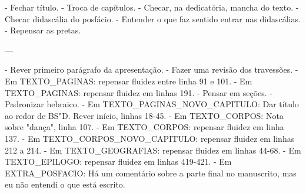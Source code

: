 - Fechar título.
- Troca de capítulos.
- Checar, na dedicatória, mancha do texto.
- Checar didascália do posfácio.
- Entender o que faz sentido entrar nas didascálias.
- Repensar as pretas.

---

- Rever primeiro parágrafo da apresentação.
- Fazer uma revisão dos travessões.
- Em TEXTO_PAGINAS: repensar fluidez entre linha 91 e 101.
- Em TEXTO_PAGINAS: repensar fluidez em linhas 191.
- Pensar em seções.
- Padronizar hebraico.
- Em TEXTO_PAGINAS_NOVO_CAPITULO: Dar título ao redor de BS"D. Rever início, linhas 18-45.
- Em TEXTO_CORPOS: Nota sobre "dança", linha 107.
- Em TEXTO_CORPOS: repensar fluidez em linha 137.
- Em TEXTO_CORPOS_NOVO_CAPITULO: repensar fluidez em linhas 212 a 214.
- Em TEXTO_GEOGRAFIAS: repensar fluidez em linhas 44-68.
- Em TEXTO_EPILOGO: repensar fluidez em linhas 419-421.
- Em EXTRA_POSFACIO: Há um comentário sobre a parte final no manuscrito, mas eu não entendi o que está escrito.